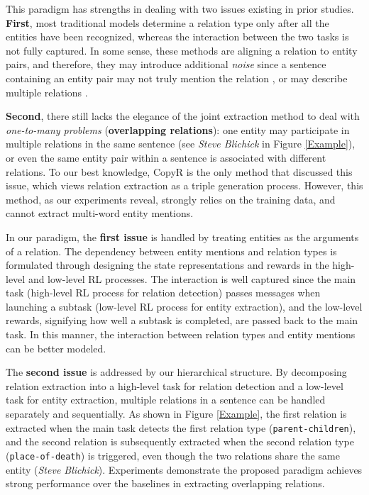 \documentclass[letterpaper]{article}
\theoremstyle{definition}
\begin{document}
This paradigm has strengths in dealing with two issues existing in prior studies.
\textbf{First}, most traditional models \cite{gormley2015improved,hoffmann2011knowledge,miwa2016end} determine a relation type only after all the entities have been recognized, whereas the interaction between the two tasks is not fully captured. In some sense, these methods are aligning a relation to entity pairs, and therefore, they may introduce additional \textit{noise} since a sentence containing an entity pair may not truly mention the relation \cite{zhang2013towards}, or may describe multiple relations \cite{takamatsu2012reducing}.

\textbf{Second}, there still lacks the elegance of the joint extraction method to deal with {\it one-to-many problems} (\textbf{overlapping relations}): one entity may participate in multiple relations in the same sentence  (see \textit{Steve Blichick} in Figure \ref{Example}), or even the same entity pair within a sentence is associated with different relations. %
To our best knowledge, CopyR \cite{zeng2018extracting} is the only method that discussed this issue, which views relation extraction as a triple generation process. However, this method, as our experiments reveal, strongly relies on the training data, and cannot extract multi-word entity mentions.

In our paradigm, the \textbf{first issue} is handled by treating entities as the arguments of a relation.
The dependency between entity mentions and relation types is formulated through designing the state representations and rewards in the high-level and low-level RL processes.
The interaction is well captured since the main task (high-level RL process for relation detection) passes messages when launching a subtask (low-level RL process for entity extraction), and the low-level rewards, signifying how well a subtask is completed, are passed back to the main task. In this manner, the interaction between relation types and entity mentions can be better modeled.

The \textbf{second issue} is addressed by our hierarchical structure. By decomposing relation extraction into a high-level task for relation detection and a low-level task for entity extraction, multiple relations in a sentence can be handled separately and sequentially. As shown in Figure \ref{Example}, the first relation is extracted when the main task detects the first relation type (\texttt{parent-children}), and the second relation is subsequently extracted when the second relation type (\texttt{place-of-death}) is triggered, even though the two relations share the same entity (\textit{Steve Blichick}). Experiments demonstrate the proposed paradigm achieves strong performance over the baselines in extracting overlapping relations.
\end{document}
